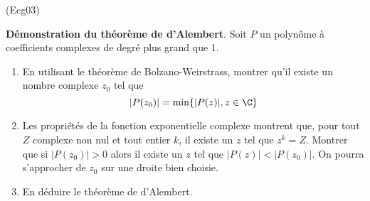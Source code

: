 \begin{tiny}(Ecg03)\end{tiny}
\textbf{Démonstration du théorème de d'Alembert}.\newline
Soit $P$ un polynôme à coefficients complexes de degré plus grand que 1.
\begin{enumerate}
\item En utilisant le théorème de Bolzano-Weirstrass, montrer qu'il existe un nombre complexe $z_0$ tel que
\[|P(z_0)|=\min \{|P(z)|, z\in \C\}\]

\item Les propriétés de la fonction exponentielle complexe montrent que, pour tout $Z$ complexe non nul et tout entier $k$, il existe un $z$ tel que $z^k=Z$.\newline
Montrer que si $|P(z_0)|>0$ alors il existe un $z$ tel que $|P(z)|<|P(z_0)|$. \newline On pourra s'approcher de $z_0$ sur une droite bien choisie.
\item En déduire le théorème de d'Alembert.
\end{enumerate} 